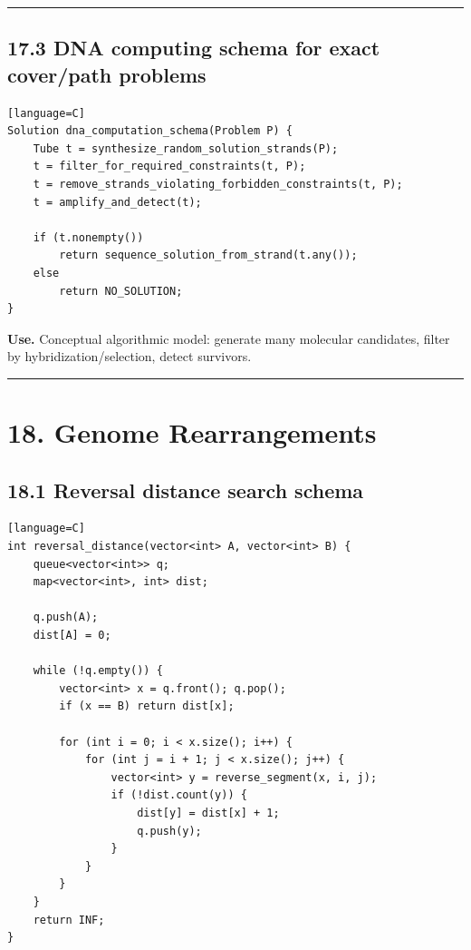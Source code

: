 \documentclass[11pt]{article}
\begin{document}
\begin{center}\rule{0.5\linewidth}{0.5pt}\end{center}

\subsection{17.3 DNA computing schema for exact cover/path problems}\label{dna-computing-schema-for-exact-coverpath-problems}

\begin{verbatim}[language=C]
Solution dna_computation_schema(Problem P) {
    Tube t = synthesize_random_solution_strands(P);
    t = filter_for_required_constraints(t, P);
    t = remove_strands_violating_forbidden_constraints(t, P);
    t = amplify_and_detect(t);

    if (t.nonempty())
        return sequence_solution_from_strand(t.any());
    else
        return NO_SOLUTION;
}
\end{verbatim}

\textbf{Use.} Conceptual algorithmic model: generate many molecular candidates, filter by hybridization/selection, detect survivors.

\begin{center}\rule{0.5\linewidth}{0.5pt}\end{center}

\section{18. Genome Rearrangements}\label{genome-rearrangements}

\subsection{18.1 Reversal distance search schema}\label{reversal-distance-search-schema}

\begin{verbatim}[language=C]
int reversal_distance(vector<int> A, vector<int> B) {
    queue<vector<int>> q;
    map<vector<int>, int> dist;

    q.push(A);
    dist[A] = 0;

    while (!q.empty()) {
        vector<int> x = q.front(); q.pop();
        if (x == B) return dist[x];

        for (int i = 0; i < x.size(); i++) {
            for (int j = i + 1; j < x.size(); j++) {
                vector<int> y = reverse_segment(x, i, j);
                if (!dist.count(y)) {
                    dist[y] = dist[x] + 1;
                    q.push(y);
                }
            }
        }
    }
    return INF;
}
\end{verbatim}
\end{document}
